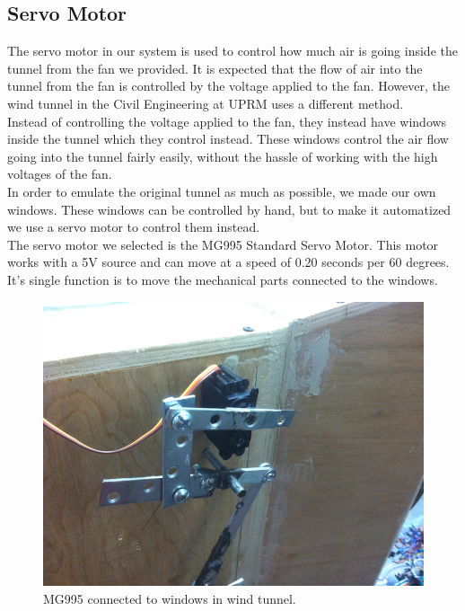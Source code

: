		\subsection{Servo Motor}
		
		The servo motor in our system is used to control how much air is going inside the tunnel from the fan we provided. It is expected that the flow of air into the tunnel from the fan is controlled by the voltage applied to the fan. However, the wind tunnel in the Civil Engineering at UPRM uses a different method. \\
		Instead of controlling the voltage applied to the fan, they instead have windows inside the tunnel which they control instead. These windows control the air flow going into the tunnel fairly easily, without the hassle of working with the high voltages of the fan. \\
		In order to emulate the original tunnel as much as possible, we made our own windows. These windows can be controlled by hand, but to make it automatized we use a servo motor to control them instead. \\
		The servo motor we selected is the MG995 Standard Servo Motor. This motor works with a 5V source and can move at a speed of 0.20 seconds per 60 degrees. It's single function is to move the mechanical parts connected to the windows. 
		
		\begin{figure}[H]
			\centering
				\includegraphics[scale=0.3]{img/servoMotor}
			\caption{MG995 connected to windows in wind tunnel.}
		\end{figure}
		

